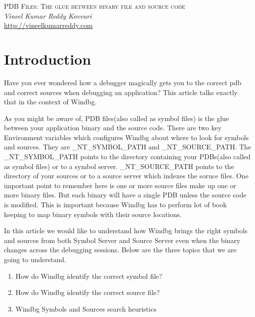 \documentclass{article}
\begin{document}
\begin{titlepage}
   \begin{center}
      \Large\textsc{PDB Files: The glue between binary file and source code}\\
      \vspace{5mm}
      \Large\textit{Vineel Kumar Reddy Kovvuri}\\
      \url{http://vineelkumarreddy.com}\\
   \end{center}
\end{titlepage}

\tableofcontents

\newpage
\section{Introduction}
Have you ever wondered how a debugger magically gets you to the correct pdb and correct sources when debugging an application? This article talks exactly that in the context of Windbg.

As you might be aware of, PDB files(also called as symbol files) is the glue between your application binary and the source code. There are two key Environment variables which configures Windbg about where to look for symbols and sources. They are \_NT\_SYMBOL\_PATH and \_NT\_SOURCE\_PATH. The \_NT\_SYMBOL\_PATH points to the directory containing your PDBs(also called as symbol files) or to a symbol server. \_NT\_SOURCE\_PATH points to the directory of your sources or to a source server which indexes the soruce files. One important point to remember here is one or more source files make up one or more binary files. But each binary will have a single PDB unless the source code is modified. This is important because Windbg has to perform lot of book keeping to map binary symbols with their source locations.

In this article we would like to understand how Windbg brings the right symbols and sources from both Symbol Server and Source Server even when the binary changes across the debugging sessions. Below are the three topics that we are going to understand.

\begin{enumerate}[noitemsep]
    \item How do Windbg identify the correct symbol file?
    \item How do Windbg identify the correct source file?
    \item Windbg Symbols and Sources search heuristics
\end{enumerate}
\end{document}
